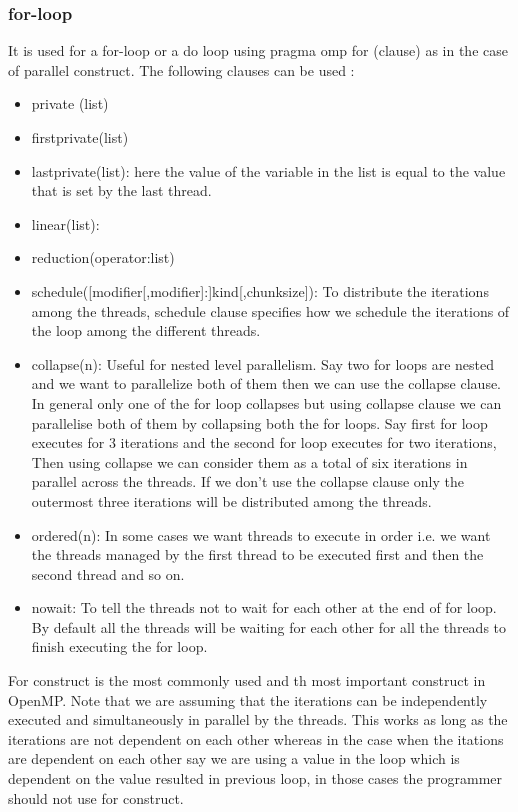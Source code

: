 \documentclass[12pt]{article}
\begin{document}
\subsubsection{for-loop}
It is used for a for-loop or a do loop using pragma omp for (clause) as in the case of parallel construct.
The following clauses can be used :
\begin{itemize}
\item private (list)
\item firstprivate(list)
\item lastprivate(list): here the value of the variable in the list is equal to the value that is set by the last thread.
\item linear(list):
\item reduction(operator:list)
\item schedule([modifier[,modifier]:]kind[,chunksize]): To distribute the iterations among the threads, schedule clause specifies how 
we schedule the iterations of the loop among the different threads.
\item collapse(n): Useful for nested level parallelism. Say two for loops are nested and we want to parallelize both of them then we can use the collapse clause. In general only one of the 
for loop collapses but using collapse clause we can parallelise both of them by collapsing both the for loops. Say first for loop executes for 3 iterations and the second for loop executes for two iterations, Then
using collapse we can consider them as a total of six iterations in parallel across the threads. If we don't use the collapse clause only the outermost three iterations will be distributed among the threads.
\item ordered(n): In some cases we want threads to execute in order i.e. we want the threads managed by the first thread to be executed first and then the second thread and so on.
\item nowait: To tell the threads not to wait for each other at the end of for loop. By default all the threads will be waiting for each other for all the threads to finish executing the for loop.
\end{itemize}
For construct is the most commonly used and th most important construct in OpenMP.
Note that we are assuming that the iterations can be independently executed and simultaneously in parallel by the threads.
This works as long as the iterations are not dependent on each other whereas in the case when the itations are dependent on each other say we are using a value in the loop which is dependent on the value resulted in previous loop,
in those cases the programmer should not use for construct.
\end{document}
